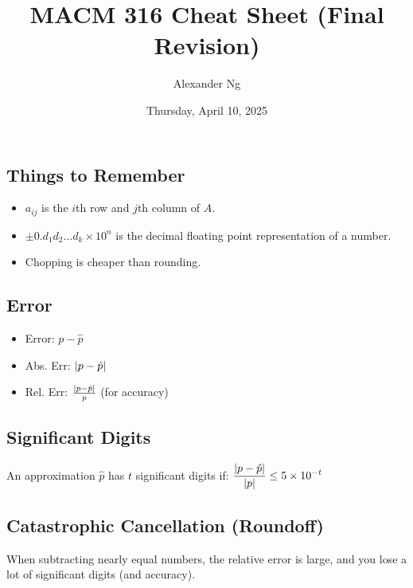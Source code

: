 \documentclass[9pt, letterpaper]{extarticle}
\begin{document}
\title{MACM 316 Cheat Sheet (Final Revision)}
\author{Alexander Ng}
\date{Thursday, April 10, 2025}


\begin{multicols*}{3}
  \section{Things to Remember}
  \begin{itemize}
    \item $a_{ij}$ is the $i$th row and $j$th column of $A$.
    \item $\pm 0.d_1d_2\dots d_k \times 10^n$ is the decimal floating point 
      representation of a number.
    \item Chopping is cheaper than rounding.
  \end{itemize}

  \subsection{Error}
  \begin{itemize} %
    \item Error: $p - \hat{p}$
    \item Abs. Err: $\abs{p - \hat{p}}$
    \item Rel. Err: $\frac{\abs{p - \hat{p}}}{p}$ (for accuracy)
  \end{itemize}

  \subsection{Significant Digits}
  An approximation $\hat p$ has $t$ significant digits if: \newline
  $\displaystyle \frac{\abs{p-\hat p}}{\abs{p}} \leq 5 \times 10^{-t}$

  \subsection{Catastrophic Cancellation (Roundoff)}
  When subtracting nearly equal numbers, the relative error is large, and you
  lose a lot of significant digits (and accuracy).


\end{multicols*}
\end{document}

